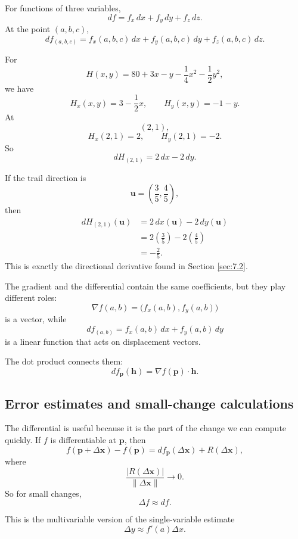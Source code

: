 For functions of three variables,
\[
\boxed{
    df=f_x\,dx+f_y\,dy+f_z\,dz.
}
\]
At the point \((a,b,c)\),
\[
\boxed{
    df_{(a,b,c)}
    =
    f_x(a,b,c)\,dx+f_y(a,b,c)\,dy+f_z(a,b,c)\,dz.
}
\]

\begin{example}
For
\[
    H(x,y)=80+3x-y-\frac14x^2-\frac12y^2,
\]
we have
\[
    H_x(x,y)=3-\frac12x,
    \qquad
    H_y(x,y)=-1-y.
\]
At
\[
    (2,1),
\]
\[
    H_x(2,1)=2,
    \qquad
    H_y(2,1)=-2.
\]
So
\[
\boxed{
    dH_{(2,1)}=2\,dx-2\,dy.
}
\]

If the trail direction is
\[
    \mathbf u=\left(\frac35,\frac45\right),
\]
then
\[
\begin{aligned}
dH_{(2,1)}(\mathbf u)
&=
2\,dx(\mathbf u)-2\,dy(\mathbf u)\\
&=
2\left(\frac35\right)-2\left(\frac45\right)\\
&=
-\frac25.
\end{aligned}
\]
This is exactly the directional derivative found in Section \ref{sec:7.2}.
\end{example}

The gradient and the differential contain the same coefficients, but they play different
roles:
\[
    \nabla f(a,b)=\bigl(f_x(a,b),f_y(a,b)\bigr)
\]
is a vector, while
\[
    df_{(a,b)}=f_x(a,b)\,dx+f_y(a,b)\,dy
\]
is a linear function that acts on displacement vectors.

The dot product connects them:
\[
    df_{\mathbf p}(\mathbf h)=\nabla f(\mathbf p)\cdot \mathbf h.
\]

\subsection{Error estimates and small-change calculations}

The differential is useful because it is the part of the change we can compute quickly.
If \(f\) is differentiable at \(\mathbf p\), then
\[
    f(\mathbf p+\Delta\mathbf x)-f(\mathbf p)
    =
    df_{\mathbf p}(\Delta\mathbf x)+R(\Delta\mathbf x),
\]
where
\[
    \frac{|R(\Delta\mathbf x)|}{\|\Delta\mathbf x\|}\to0.
\]
So for small changes,
\[
\boxed{
    \Delta f\approx df.
}
\]

This is the multivariable version of the single-variable estimate
\[
    \Delta y\approx f'(a)\Delta x.
\]

